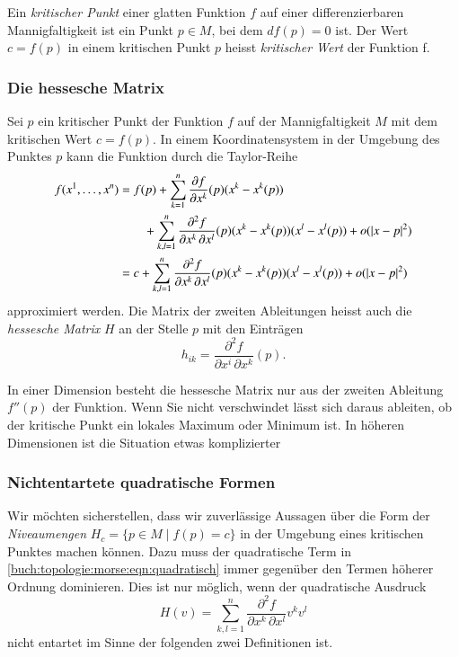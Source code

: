 \begin{definition}
%
%
%
%
Ein \emph{kritischer Punkt} einer glatten Funktion $f$ auf einer
differenzierbaren Mannigfaltigkeit ist ein Punkt $p\in M$, bei dem
$df(p)=0$ ist.
Der Wert $c=f(p)$ in einem kritischen Punkt $p$ heisst
\emph{kritischer Wert} der Funktion f.
\end{definition}

%
%
\subsubsection{Die hessesche Matrix}
Sei $p$ ein kritischer Punkt der Funktion $f$ auf der Mannigfaltigkeit $M$
mit dem kritischen Wert $c=f(p)$.
In einem Koordinatensystem in der Umgebung des Punktes $p$ kann die Funktion
durch die Taylor-Reihe 
\begin{align}
f(x^1,\dots,x^n)
&=
f(p)
+
\sum_{k=1}^n \frac{\partial f}{\partial x^k}(p) (x^k-x^k(p))
\\
&\qquad\mathstrut
+
\sum_{k,l=1}^n
\frac{\partial^2 f}{\partial x^k\,\partial x^l}(p)
(x^k-x^k(p))(x^l-x^l(p))
+
o(|x-p|^2)
\notag
\\
&=
c
+
\sum_{k,l=1}^n
\frac{\partial^2 f}{\partial x^k\,\partial x^l}(p)
(x^k-x^k(p))(x^l-x^l(p))
+
o(|x-p|^2)
\label{buch:topologie:morse:eqn:quadratisch}
\end{align}
approximiert werden.
Die Matrix der zweiten Ableitungen heisst auch die \emph{hessesche Matrix}
$H$ an der Stelle $p$ mit den Einträgen
\[
h_{ik}
=
\frac{\partial^2 f}{\partial x^i\,\partial x^k}(p).
\]

In einer Dimension besteht die hessesche Matrix nur aus der zweiten
Ableitung $f''(p)$ der Funktion.
Wenn Sie nicht verschwindet lässt sich daraus ableiten, ob der
kritische Punkt ein lokales Maximum oder Minimum ist.
In höheren Dimensionen ist die Situation etwas komplizierter

%
%
\subsubsection{Nichtentartete quadratische Formen}
Wir möchten sicherstellen, dass wir zuverlässige Aussagen über die
Form der \emph{Niveaumengen} $H_c=\{p\in M\mid f(p)=c\}$ in der
Umgebung eines kritischen Punktes machen können.
Dazu muss der quadratische Term in
\eqref{buch:topologie:morse:eqn:quadratisch}
immer gegenüber den Termen höherer Ordnung dominieren.
Dies ist nur möglich, wenn der quadratische Ausdruck
\[
H(v)
=
\sum_{k,l=1}^n
\frac{\partial^2 f}{\partial x^k\,\partial x^l}
v^k v^l
\]
nicht entartet im Sinne der folgenden zwei Definitionen ist.

